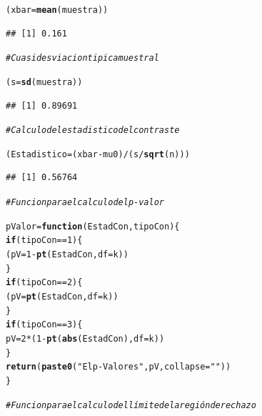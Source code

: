 \documentclass[10pt,a4paper]{article}\usepackage[]{graphicx}\usepackage[]{color}
\makeatletter
\newcommand{\hlnum}[1]{\textcolor[rgb]{0.686,0.059,0.569}{#1}}%
\newcommand{\hlstr}[1]{\textcolor[rgb]{0.192,0.494,0.8}{#1}}%
\newcommand{\hlcom}[1]{\textcolor[rgb]{0.678,0.584,0.686}{\textit{#1}}}%
\newcommand{\hlopt}[1]{\textcolor[rgb]{0,0,0}{#1}}%
\newcommand{\hlstd}[1]{\textcolor[rgb]{0.345,0.345,0.345}{#1}}%
\newcommand{\hlkwa}[1]{\textcolor[rgb]{0.161,0.373,0.58}{\textbf{#1}}}%
\newcommand{\hlkwb}[1]{\textcolor[rgb]{0.69,0.353,0.396}{#1}}%
\newcommand{\hlkwc}[1]{\textcolor[rgb]{0.333,0.667,0.333}{#1}}%
\newcommand{\hlkwd}[1]{\textcolor[rgb]{0.737,0.353,0.396}{\textbf{#1}}}%
\newenvironment{kframe}{%
 \def\at@end@of@kframe{}%
 \ifinner\ifhmode%
  \def\at@end@of@kframe{\end{minipage}}%
  \begin{minipage}{\columnwidth}%
 \fi\fi%
 \def\FrameCommand##1{\hskip\@totalleftmargin \hskip-\fboxsep
 \colorbox{shadecolor}{##1}\hskip-\fboxsep
     \hskip-\linewidth \hskip-\@totalleftmargin \hskip\columnwidth}%
 \MakeFramed {\advance\hsize-\width
   \@totalleftmargin\z@ \linewidth\hsize
   \@setminipage}}%
 {\par\unskip\endMakeFramed%
 \at@end@of@kframe}
\newenvironment{knitrout}{}{} %
\newcounter {cont01}
\makeatother
\begin{document}
\begin{knitrout}
\begin{kframe}
\begin{alltt}
\hlstd{(xbar} \hlkwb{=} \hlkwd{mean}\hlstd{(muestra))}
\end{alltt}
\begin{verbatim}
## [1] 0.161
\end{verbatim}
\begin{alltt}
\hlcom{# Cuasidesviacion tipica muestral}

\hlstd{(s} \hlkwb{=} \hlkwd{sd}\hlstd{(muestra))}
\end{alltt}
\begin{verbatim}
## [1] 0.89691
\end{verbatim}
\begin{alltt}
\hlcom{# Calculo del estadistico del contraste}

\hlstd{(Estadistico} \hlkwb{=} \hlstd{(xbar} \hlopt{-} \hlstd{mu0)} \hlopt{/} \hlstd{(s}\hlopt{/}\hlkwd{sqrt}\hlstd{(n)))}
\end{alltt}
\begin{verbatim}
## [1] 0.56764
\end{verbatim}
\begin{alltt}
\hlcom{# Funcion para el calculo del p-valor}

 \hlstd{pValor} \hlkwb{=} \hlkwa{function}\hlstd{(}\hlkwc{EstadCon}\hlstd{,} \hlkwc{tipoCon}\hlstd{)\{}
      \hlkwa{if}\hlstd{(tipoCon} \hlopt{==} \hlnum{1}\hlstd{)\{}
        \hlstd{(pV} \hlkwb{=} \hlnum{1} \hlopt{-} \hlkwd{pt}\hlstd{(EstadCon,} \hlkwc{df}\hlstd{=k ))}
      \hlstd{\}}
      \hlkwa{if}\hlstd{(tipoCon} \hlopt{==} \hlnum{2}\hlstd{)\{}
        \hlstd{(pV} \hlkwb{=} \hlkwd{pt}\hlstd{(EstadCon,} \hlkwc{df}\hlstd{=k ))}
      \hlstd{\}}
      \hlkwa{if}\hlstd{(tipoCon} \hlopt{==} \hlnum{3}\hlstd{)\{}
        \hlstd{pV} \hlkwb{=} \hlnum{2} \hlopt{*} \hlstd{(}\hlnum{1} \hlopt{-} \hlkwd{pt}\hlstd{(}\hlkwd{abs}\hlstd{(EstadCon),} \hlkwc{df}\hlstd{=k ))}
      \hlstd{\}}
      \hlkwd{return}\hlstd{(}\hlkwd{paste0}\hlstd{(}\hlstr{"El p-Valor es "}\hlstd{, pV,} \hlkwc{collapse}\hlstd{=}\hlstr{""}\hlstd{))}
    \hlstd{\}}

\hlcom{# Funcion para el calculo del límite de la región de rechazo}


\end{alltt}
\end{kframe}
\end{knitrout}
\end{document}
